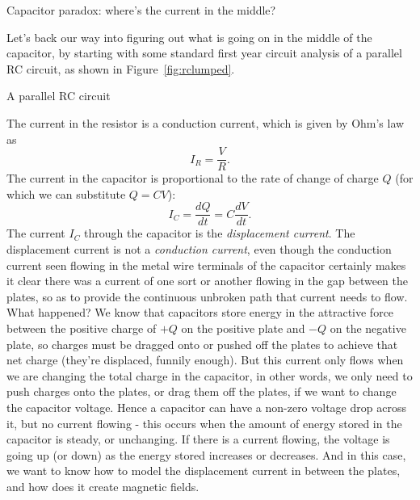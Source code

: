 \documentclass{tufte-handout}
\begin{document}


\begin{marginfigure}

\caption{Capacitor paradox: where's the current in the middle? }
\label{fig:paradox}
\end{marginfigure} 

Let's back our way into figuring out what is going on in the middle of the capacitor, by starting with some standard first year circuit analysis of a parallel RC circuit, as shown in Figure~\ref{fig:rclumped}.
\begin{marginfigure}

\caption{A parallel RC circuit}
\label{fig:rclumped}
\end{marginfigure} 
The current in the resistor is a conduction current, which is given by Ohm's law as
\begin{equation} I_R = \frac{V}{R}.\end{equation}
The current in the capacitor is proportional to the rate of change of charge $Q$ (for which we can substitute $Q=CV$): 
\begin{equation} 
\label{eq:ic}
I_C = \frac{dQ}{dt}=C\frac{dV}{dt}.
\end{equation}
The current $I_C$ through the capacitor is the \emph{displacement current}. The displacement current is not a \emph{conduction current}, even though the conduction current seen flowing in the metal wire terminals of the capacitor certainly makes it clear there was a current of one sort or another flowing in the gap between the plates, so as to provide the continuous unbroken path that current needs to flow. What happened? We know that capacitors store energy in the attractive force between the positive charge of $+Q$ on the positive plate and $-Q$ on the negative plate, so  charges must be dragged onto or pushed off the plates to achieve that net charge (they're displaced, funnily enough). But this current only flows when we are changing the total charge in the capacitor, in other words, we only need to push charges onto the plates, or drag them off the plates, if we want to change the capacitor voltage. Hence a capacitor can have a non-zero voltage drop across it, but no current flowing - this occurs when the amount of energy stored in the capacitor is steady, or unchanging. If there is a current flowing, the voltage is going up (or down) as the energy stored increases or decreases. And in this case, we want to know how to model the displacement current in between the plates, and how does it create magnetic fields. 
\end{document}
